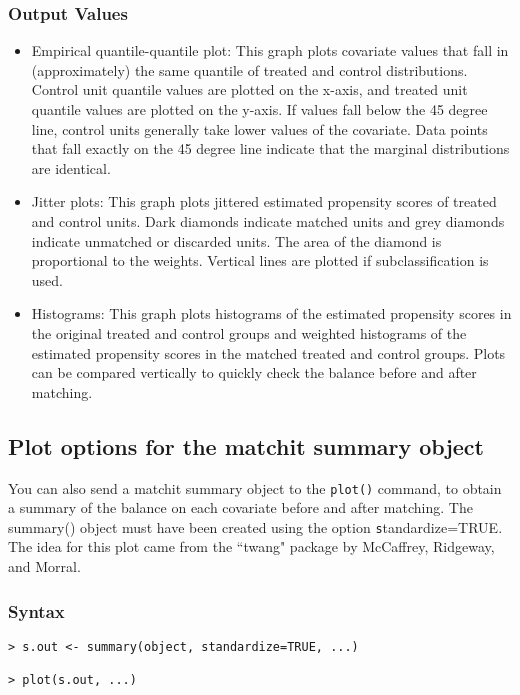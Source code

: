 \subsubsection{Output Values}

\begin{itemize}
\item Empirical quantile-quantile plot: This graph plots covariate
  values that fall in (approximately) the same quantile of treated and
  control distributions.  Control unit quantile values are plotted on
  the x-axis, and treated unit quantile values are plotted on the
  y-axis.  If values fall below the 45 degree line, control units
  generally take lower values of the covariate.  Data points that fall
  exactly on the 45 degree line indicate that the marginal
  distributions are identical.
  
\item Jitter plots: This graph plots jittered estimated propensity
  scores of treated and control units.  Dark diamonds indicate matched
  units and grey diamonds indicate unmatched or discarded units.  The
  area of the diamond is proportional to the weights. Vertical lines
  are plotted if subclassification is used.

\item Histograms: This graph plots histograms of the estimated propensity 
scores in the original treated and control groups and weighted histograms of the estimated
propensity scores in the matched treated and control groups.  Plots can be compared vertically to
quickly check the balance before and after matching.  

\end{itemize}

\subsection{Plot options for the matchit summary object}
You can also send a matchit summary object to the \texttt{plot()} command, to obtain
a summary of the balance on each covariate before and after matching.  The summary() object
must have been created using the option {\texttt standardize=TRUE}.  The idea for this plot
came from the ``twang" package by McCaffrey, Ridgeway, and Morral.  

\subsubsection{Syntax}

\begin{verbatim}
> s.out <- summary(object, standardize=TRUE, ...)

> plot(s.out, ...)
\end{verbatim}

